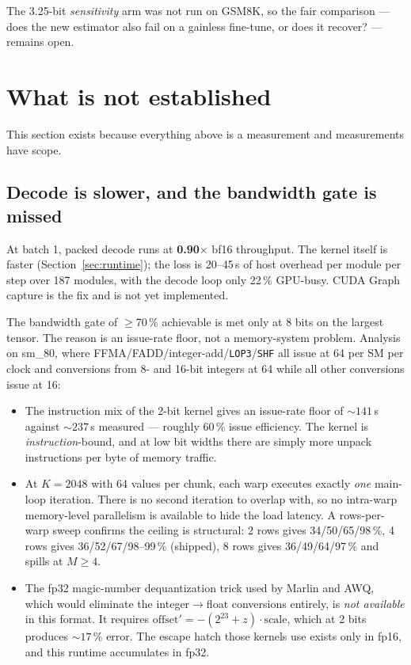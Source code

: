 \documentclass[11pt]{article}
\newcommand{\x}{$\times$}
\newcommand{\pct}{\,\%}
\newcommand{\code}[1]{\texttt{#1}}
\begin{document}
The 3.25-bit \emph{sensitivity} arm was not run on GSM8K, so the fair comparison --- does the new
estimator also fail on a gainless fine-tune, or does it recover? --- remains open.

\newpage
\section{What is not established}
\label{sec:notestablished}

This section exists because everything above is a measurement and measurements have scope.

\subsection{Decode is slower, and the bandwidth gate is missed}

At batch 1, packed decode runs at \textbf{0.90\x} bf16 throughput. The kernel itself is faster
(Section~\ref{sec:runtime}); the loss is 20--45\,\textmu s of host overhead per module per step
over 187 modules, with the decode loop only 22\pct{} GPU-busy. CUDA Graph capture is the fix and
is not yet implemented.

The bandwidth gate of $\ge$70\pct{} achievable is met only at 8 bits on the largest tensor. The
reason is an issue-rate floor, not a memory-system problem. Analysis on sm\_80, where
FFMA/FADD/integer-add/\code{LOP3}/\code{SHF} all issue at 64 per SM per clock and conversions
from 8- and 16-bit integers at 64 while all other conversions issue at 16:

\begin{itemize}
\item The instruction mix of the 2-bit kernel gives an issue-rate floor of ${\sim}141$\,\textmu s
against ${\sim}237$\,\textmu s measured --- roughly 60\pct{} issue efficiency. The kernel is
\emph{instruction}-bound, and at low bit widths there are simply more unpack instructions per
byte of memory traffic.
\item At $K = 2048$ with 64 values per chunk, each warp executes exactly \emph{one} main-loop
iteration. There is no second iteration to overlap with, so no intra-warp memory-level
parallelism is available to hide the load latency. A rows-per-warp sweep confirms the ceiling is
structural: 2 rows gives 34/50/65/98\pct, 4 rows gives 36/52/67/98--99\pct{} (shipped), 8 rows
gives 36/49/64/97\pct{} and spills at $M \ge 4$.
\item The fp32 magic-number dequantization trick used by Marlin and AWQ, which would eliminate
the integer$\to$float conversions entirely, is \emph{not available} in this format. It requires
$\text{offset}' = -(2^{23} + z)\cdot\text{scale}$, which at 2 bits produces ${\sim}17\pct$ error.
The escape hatch those kernels use exists only in fp16, and this runtime accumulates in fp32.
\end{itemize}
\end{document}
